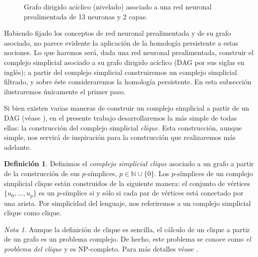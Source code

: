 \documentclass[12pt, a4paper, twoside]{book}
\numberwithin{equation}{section}
\theoremstyle{definition}
\newtheorem{defi}{Definición}[section]
\newenvironment{ejem}
  {\pushQED{\qed}\renewcommand{\qedsymbol}{$\blacktriangleleft$}\ejemplo}
  {\popQED\endejemplo}
\theoremstyle{remark}
\newtheorem*{remark}{Nota}
\theoremstyle{plain}
\begin{document}
\begin{ejem}
\begin{figure}[!htbp]
			\caption{Grafo dirigido acíclico (nivelado) asociado a 
			una red neuronal prealimentada de 13 neuronas y 2 capas.}
			\label{fig:redEjem}
		\end{figure}
	\end{ejem}

	Habiendo fijado los conceptos de red neuronal prealimentada y de su 
	grafo asociado, no parece evidente la aplicación de la homología 
	persistente a estas nociones. Lo que haremos será, dada una red 
	neuronal prealimentada, construir el complejo simplicial asociado a su
	grafo dirigido acíclico (DAG por sus siglas en inglés); a partir del 
	complejo simplicial construiremos un complejo simplicial filtrado, y 
	sobre éste consideraremos la homología persistente. En esta subsección
	ilustraremos únicamente el primer paso.

	Si bien existen varias maneras de construir un complejo simplicial a 
	partir de un DAG (véase \cite{Clique-Jakob}), en el presente trabajo desarrollaremos la más simple
	de todas ellas: la construcción del complejo simplicial \emph{clique}. 
	Esta construcción, aunque simple, nos servirá de inspiración para la 
	construcción que realizaremos más adelante. 
	
	\begin{defi}
		Definimos el \textit{complejo simplicial clique} asociado a un
		grafo a partir de la construcción de sus $p$-símplices, $p \in 
		\mathbb{N}\cup\{0\}$. Los $p$-símplices de un complejo 
		simplicial clique están construidos de la siguiente manera: el 
		conjunto de vértices $\{u_{0},\dots,u_{p}\}$ es un 
		$p$-símplice si y sólo si cada par de vértices está conectado 
		por una arista. Por simplicidad del lenguaje, nos referiremos
		a un complejo simplicial clique como clique.
	\end{defi}

	\begin{remark}
		Aunque la definición de clique es sencilla, el cálculo de un 
		clique a partir de un grafo es un problema complejo. De hecho,
		este problema se conoce como \emph{el problema del clique} y 
		es NP-completo. Para más detalles véase \cite{NP-Karp}.
	\end{remark}
\end{document}
